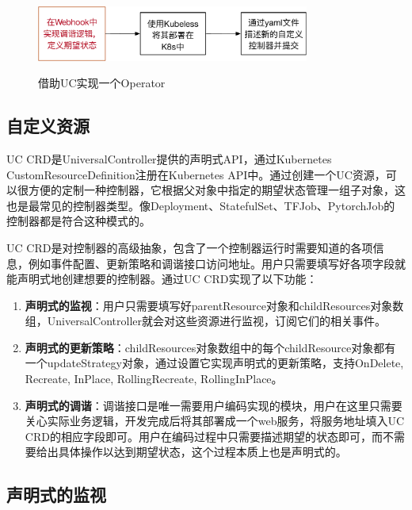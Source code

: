 \documentclass[macfonts,master]{njuthesis}
\begin{document}
\begin{figure}[htbp]
  \centering
  \includegraphics[width=0.8\textwidth]{pics/uc-coding-operator.pdf}\\
  \caption{借助UC实现一个Operator}\label{fig:uc-coding-operator}
\end{figure}


\subsection{自定义资源}

UC CRD是UniversalController提供的声明式API，通过Kubernetes CustomResourceDefinition注册在Kubernetes API中。通过创建一个UC资源，可以很方便的定制一种控制器，它根据父对象中指定的期望状态管理一组子对象，这也是最常见的控制器类型。像Deployment、StatefulSet、TFJob、PytorchJob的控制器都是符合这种模式的。

UC CRD是对控制器的高级抽象，包含了一个控制器运行时需要知道的各项信息，例如事件配置、更新策略和调谐接口访问地址。用户只需要填写好各项字段就能声明式地创建想要的控制器。通过UC CRD实现了以下功能：

\begin{enumerate}
	\item \textbf{声明式的监视}：用户只需要填写好parentResource对象和childResources对象数组，UniversalController就会对这些资源进行监视，订阅它们的相关事件。
	\item \textbf{声明式的更新策略}：childResources对象数组中的每个childResource对象都有一个updateStrategy对象，通过设置它实现声明式的更新策略，支持OnDelete, Recreate, InPlace, RollingRecreate, RollingInPlace。
	\item \textbf{声明式的调谐}：调谐接口是唯一需要用户编码实现的模块，用户在这里只需要关心实际业务逻辑，开发完成后将其部署成一个web服务，将服务地址填入UC CRD的相应字段即可。用户在编码过程中只需要描述期望的状态即可，而不需要给出具体操作以达到期望状态，这个过程本质上也是声明式的。
\end{enumerate}

\subsection{声明式的监视}
\end{document}
